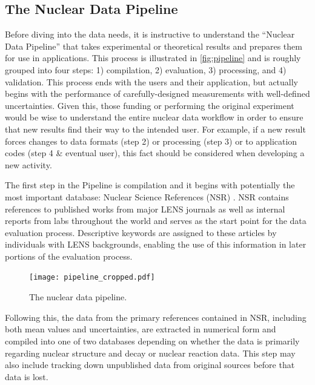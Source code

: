\documentclass[letterpaper]{ar-1col}
\begin{document}
\subsection{The Nuclear Data Pipeline}
\label{sec:pipeline}

Before diving into the data needs, it is instructive to understand the \enquote{Nuclear Data Pipeline} that takes experimental or theoretical results and prepares them for use in applications.
 This process is illustrated in \autoref{fig:pipeline} and is roughly grouped into four steps: 1) compilation, 2) evaluation, 3) processing, and 4) validation.
 This process ends with the users and their application, but actually begins with the performance of carefully-designed measurements with well-defined uncertainties.
 Given this,  those funding or performing the original experiment would be wise to understand the entire nuclear data workflow in order to ensure that new results find their way to the intended user.
 For example, if a new result forces changes to data formats (step 2) or processing (step 3) or to application codes (step 4 \& eventual user), this fact should be considered when developing a new activity.

The first step in the Pipeline is compilation and it begins with potentially the most important database: Nuclear Science References (NSR) \cite{NSR}.
 NSR contains references to published works from major LENS journals as well as internal reports from labs throughout the world and serves as the start point for the data evaluation process.
Descriptive keywords are assigned to these articles by individuals with LENS backgrounds, enabling the use of this information in later portions of the evaluation process.
  



\begin{figure}
\centering
\texttt{[image: pipeline\_cropped.pdf]}
\caption{\label{fig:pipeline}The nuclear data pipeline.}
\end{figure}



Following this, the data from the primary references contained in NSR, including both mean values and uncertainties, are extracted in numerical form and compiled into one of two databases depending on whether the data is primarily regarding nuclear structure and decay or nuclear reaction data.
  This step may also include tracking down unpublished data from original sources before that data is lost.
\end{document}
